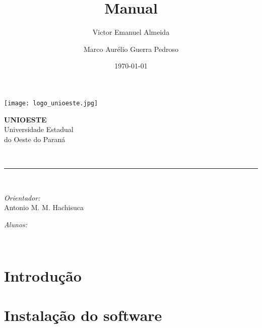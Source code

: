 \documentclass[12pt, a4paper]{article}
\author{Victor Emanuel Almeida \and Marco Aurélio Guerra Pedroso}
\title{Manual}
\date{\today}
\newcommand{\prof}{Antonio M. M. Hachisuca}
\begin{document}
\begin{titlepage}
	\centering
	\thispagestyle{fancy}

	\begin{minipage}{0.4\textwidth}
		\begin{flushleft}
			\texttt{[image: logo\_unioeste.jpg]}\\[1.0 cm]
		\end{flushleft}
	\end{minipage}
	\begin{minipage}{0.5\textwidth}
		\begin{flushright}\large
			\textsc{\LARGE\textbf{UNIOESTE}}\\
			\vspace{1cm}
			Universidade Estadual\\do Oeste do Paraná
		\end{flushright}
	\end{minipage}
	\vspace*{4.5 cm}

	{\huge\bfseries\thetitle}\\
	\rule{\linewidth}{0.2 mm}\\[1.5 cm]
	
	\vspace{2cm}
	\begin{minipage}[t]{0.4\textwidth}
		\begin{flushleft}\large
			\emph{Orientador:}\\
			\prof\\
		\end{flushleft}
	\end{minipage}
	\begin{minipage}[t]{0.5\textwidth}

		\begin{flushright}\large
			\emph{Alunos:}\\
			\theauthor
		\end{flushright}

	\end{minipage}\\[2 cm]
	
	\vfill\thedate
	\end{titlepage}

	\pagestyle{fancy}
	\fancyfoot[L]{}
	\fancyhead[L]{}
	\fancyhead[R]{}

	\tableofcontents
	\listoffigures

	\section{Introdução}\label{Introdução}

	\newpage
	\section{Instalação do software}\label{Instalação do software}
\end{document}
